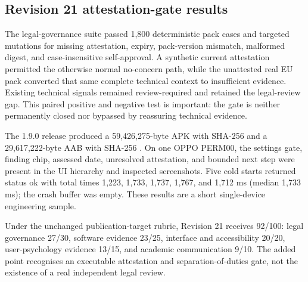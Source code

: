 \subsection{Revision 21 attestation-gate results}

The legal-governance suite passed 1,800 deterministic pack cases and targeted mutations for missing attestation, expiry, pack-version mismatch, malformed digest, and case-insensitive self-approval. A synthetic current attestation permitted the otherwise normal no-concern path, while the unattested real EU pack converted that same complete technical context to insufficient evidence. Existing technical signals remained review-required and retained the legal-review gap. This paired positive and negative test is important: the gate is neither permanently closed nor bypassed by reassuring technical evidence.

The 1.9.0 release produced a 59,426,275-byte APK with SHA-256 \texttt{} and a 29,617,222-byte AAB with SHA-256 \texttt{}. On one OPPO PERM00, the settings gate, finding chip, assessed date, unresolved attestation, and bounded next step were present in the UI hierarchy and inspected screenshots. Five cold starts returned status ok with total times 1,223, 1,733, 1,737, 1,767, and 1,712 ms (median 1,733 ms); the crash buffer was empty. These results are a short single-device engineering sample.

Under the unchanged publication-target rubric, Revision 21 receives 92/100: legal governance 27/30, software evidence 23/25, interface and accessibility 20/20, user-psychology evidence 13/15, and academic communication 9/10. The added point recognises an executable attestation and separation-of-duties gate, not the existence of a real independent legal review.
